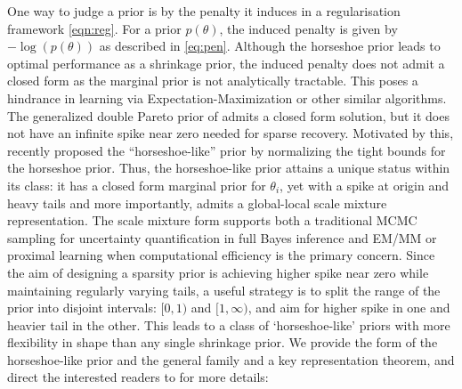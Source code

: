 \documentclass[11pt]{article}
\begin{document}
One way to judge a prior is by the penalty it induces in a regularisation
framework \eqref{eqn:reg}. For a prior $p(\theta)$, the induced penalty is
given by $-\log(p(\theta))$ as described in \eqref{eq:pen}. Although the horseshoe prior leads
to optimal performance as a shrinkage prior, the induced penalty does not admit
a closed form as the marginal prior is not analytically tractable. This poses a
hindrance in learning via Expectation-Maximization or other similar algorithms.
The generalized double Pareto prior of \citet{armagan2011generalized} admits a
closed form solution, but it does not have an infinite spike near zero needed
for sparse recovery. Motivated by this, \citet{bhadra2017horseshoe} recently
proposed the ``horseshoe-like'' prior by normalizing the tight bounds for the
horseshoe prior. Thus, the horseshoe-like prior attains a unique status within
its class: it has a closed form marginal prior for $\theta_i$, yet with a spike
at origin and heavy tails and more importantly, admits a global-local scale
mixture representation. The scale mixture form supports both a traditional MCMC
sampling for uncertainty quantification in full Bayes inference and EM/MM or
proximal learning when computational efficiency is the primary concern. Since
the aim of designing a sparsity prior is achieving higher spike near zero while
maintaining regularly varying tails, a useful strategy is to split the range of
the prior into disjoint intervals: $[0,1)$ and $[1, \infty)$, and aim for
higher spike in one and heavier tail in the other. This leads to a class of
`horseshoe-like' priors with more flexibility in shape than any single
shrinkage prior. We provide the form of the horseshoe-like prior and the
general family and a key representation theorem, and direct the interested
readers to \citet{bhadra2017horseshoe} for more details: 
\end{document}
